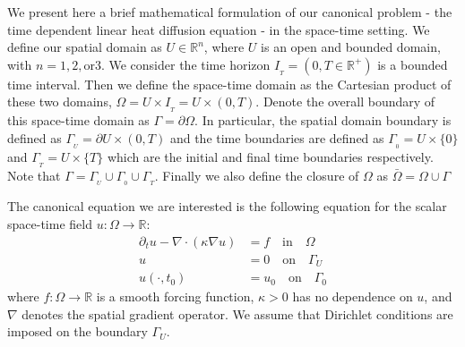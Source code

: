 
We present here a brief mathematical formulation of our canonical problem - the time dependent linear heat diffusion equation - in the space-time setting. We define our spatial domain as $U \in \mathbb{R}^n$, where $U$ is an open and bounded domain, with $n = 1, 2, \text{or} 3$. We consider the time horizon $I_{_T} = (0,T\in \mathbb{R^+})$ is a bounded time interval. Then we define the space-time domain as the Cartesian product of these two domains, $\Omega = U \times I_{_T} = U\times(0,T)$. Denote the overall boundary of this space-time domain as $\Gamma = \partial \Omega$. In particular, the spatial domain boundary is defined as $\Gamma_{_U} = \partial U \times (0,T)$ and the time boundaries are defined as $\Gamma_{_0} = U\times\{0\}$ and $\Gamma_{_T} = U\times\{T\}$ which are the initial and final time boundaries respectively. Note that $\Gamma = \Gamma_{_U}\cup\Gamma_{_0}\cup\Gamma_{_T}$. Finally we also define the closure of $\Omega$ as $\bar{\Omega} = \Omega \cup \Gamma$

The canonical equation we are interested is the following equation for the scalar space-time field $u: \Omega \rightarrow \mathbb{R}$:
\begin{subequations}\label{eq:linearheat}
\begin{align}
    \partial_t u - \nabla\cdot(\kappa\nabla u) &=f \quad \textrm{in}\quad\Omega\\
u&=0\quad \textrm{on}\quad\Gamma_U\\
u(\cdot,t_0)&=u_0\quad \textrm{on}\quad \Gamma_{0}
\end{align}
\end{subequations}
where $f: \Omega \rightarrow \mathbb{R}$ is a smooth forcing function, $\kappa > 0$ has no dependence on $u$, and $\nabla$ denotes the spatial gradient operator. We assume that Dirichlet conditions are imposed on the boundary $\Gamma_U$. 

